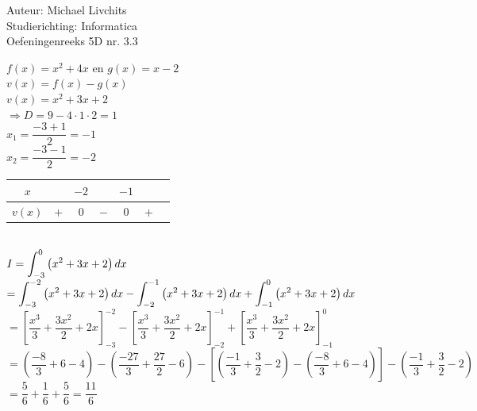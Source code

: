 \documentclass[a4paper]{article}
\newcommand{\dint}{\displaystyle\int}
\begin{document}
  
\noindent \large Auteur: Michael Livchits \\
\noindent \large Studierichting: Informatica\\
\noindent \large Oefeningenreeks 5D nr. 3.3\\

\medskip

\normalsize

$f(x) = x^2+4x$ en $g(x) = x-2$\\

$v(x) = f(x)-g(x)$\\

$v(x) = x^2+3x+2$\\

$\Rightarrow D = 9-4\cdot1\cdot2 = 1$\\

$x_1 = \dfrac{-3+1}{2} = -1$\\

$x_2 = \dfrac{-3-1}{2} = -2$\\

\begin{tabular}{c|cccccc}
    $x$ &   &   $-2$&       &   $-1$    &       & \\ \hline
    $v(x)$  &   $+$ &   $0$ &   $-$     &   $0$ &   $+$   &   \\
\end{tabular}\\

$I = \displaystyle\dint_{-3}^0 \left(x^2+3x+2\right)dx$\\

$= \displaystyle\dint_{-3}^{-2} \left(x^2+3x+2\right)dx - \displaystyle\dint_{-2}^{-1} \left(x^2+3x+2\right)dx + \displaystyle\dint_{-1}^0 \left(x^2+3x+2\right)dx$\\

$= \left[\dfrac{x^3}{3} + \dfrac{3x^2}{2} + 2x\right]_{-3}^{-2} - \left[\dfrac{x^3}{3} + \dfrac{3x^2}{2} + 2x\right]_{-2}^{-1} + \left[\dfrac{x^3}{3} + \dfrac{3x^2}{2} + 2x\right]_{-1}^{0}$\\

$= \left(\dfrac{-8}{3} + 6 - 4\right) - \left(\dfrac{-27}{3} + \dfrac{27}{2} - 6\right) - \left[\left(\dfrac{-1}{3} + \dfrac{3}{2} - 2\right) - \left(\dfrac{-8}{3} + 6 - 4\right)\right]  - \left(\dfrac{-1}{3} + \dfrac{3}{2} - 2\right)$\\

$= \dfrac{5}{6} + \dfrac{1}{6} + \dfrac{5}{6} = \dfrac{11}{6}$\\
\end{document}
